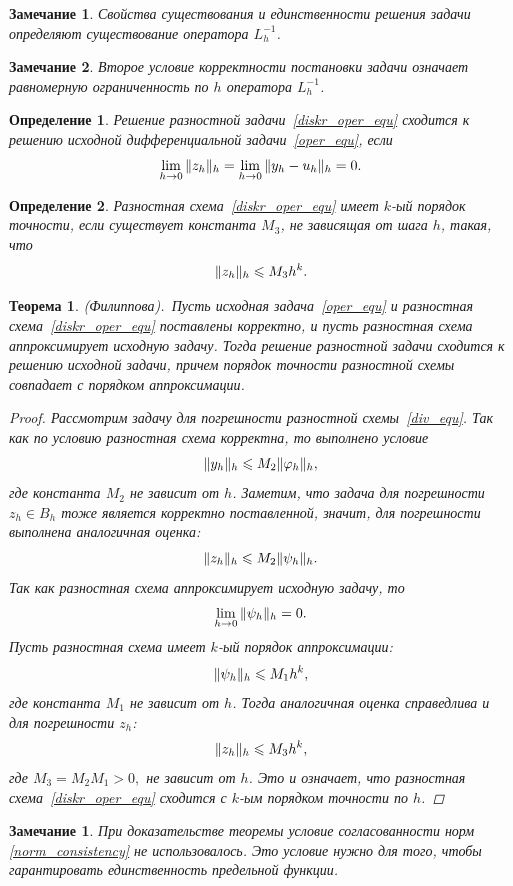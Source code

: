 \documentclass[11pt,a4paper,twoside]{report}
\numberwithin{equation}{section}
\newtheorem*{definition}{Определение}
\theoremstyle{definition}
\theoremstyle{plain}
\newtheorem{theorem}{Теорема}[section]
\newtheorem{note}{Замечание}[section]
\newtheorem*{note*}{Замечание}
\DeclarePairedDelimiter\norm{\lVert}{\rVert}
\begin{document}
%
%
\begin{note}
%
    Свойства существования и единственности решения задачи определяют существование
    оператора $L_h^{-1}$.
%
\end{note}
%
%
\begin{note}
%
    Второе условие корректности постановки задачи означает
    равномерную ограниченность по $h$ оператора $L_h^{-1}$.
%
\end{note}
%
%
\begin{definition}
%
    Решение разностной задачи~\eqref{diskr_oper_equ} сходится к решению исходной
    дифференциальной задачи~\eqref{oper_equ}, если
    $$
        \lim_{h\rightarrow0}{\norm{z_h}_h}=\lim_{h\rightarrow0}{\norm{y_h-u_h}_h}=0.
    $$
%
\end{definition}
%
%
\begin{definition}
%
    Разностная схема~\eqref{diskr_oper_equ} имеет $k$-ый порядок точности, если
    существует константа $M_3$, не зависящая от шага $h$, такая, что
    $$
        \norm{z_h}_h \leqslant M_3h^k.
    $$
%
\end{definition}
%
%
\begin{theorem}
%
    (Филиппова).~Пусть исходная задача~\eqref{oper_equ} и разностная
    схема~\eqref{diskr_oper_equ}
     поставлены корректно, и пусть разностная схема аппроксимирует исходную задачу.
    Тогда решение разностной задачи сходится к
    решению исходной задачи, причем порядок точности разностной схемы совпадает
    с порядком аппроксимации.
    \begin{proof}
        Рассмотрим задачу для погрешности разностной схемы~\eqref{div_equ}.
        Так как по условию разностная схема корректна, то выполнено условие
        $$
            \norm{y_h}_h \leqslant M_2 \norm{\varphi_h}_h,
        $$
        где константа $M_2$ не зависит от $h$. Заметим, что задача для
        погрешности $z_h \in B_h$ тоже является корректно поставленной, значит,
        для погрешности выполнена аналогичная оценка:
        $$
            \norm{z_h}_h \leqslant M_2\norm{\psi_h}_h.
        $$
        Так как разностная схема аппроксимирует исходную задачу, то
        $$
            \lim_{h\rightarrow0}{\norm{\psi_h}_h}=0.
        $$
        Пусть разностная схема имеет $k$-ый порядок аппроксимации:
        $$
            \norm{\psi_h}_h \leqslant M_1h^k,
        $$
        где константа $M_1$ не зависит от $h$. Тогда аналогичная оценка справедлива и
        для погрешности $z_h$:
        $$
            \norm{z_h}_h \leqslant M_3h^k,
        $$
        где $M_3=M_2M_1 >0,$ не зависит от $h$. Это и означает,
        что разностная схема~\eqref{diskr_oper_equ} сходится с $k$-ым порядком
        точности по $h$.
    \end{proof}
%
\end{theorem}
%
%
\begin{note*}
%
При доказательстве теоремы условие согласованности норм \eqref{norm_consistency}
не использовалось. Это условие нужно для того, чтобы гарантировать
единственность предельной функции.
%
\end{note*}
%
\end{document}
